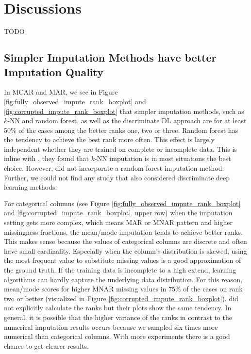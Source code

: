 

\section{Discussions}

TODO

\subsection{Simpler Imputation Methods have better Imputation Quality}
%
In MCAR and MAR, we see in Figure \ref{fig:fully_observed_impute_rank_boxplot} and \ref{fig:corrupted_impute_rank_boxplot} that simpler imputation methods, such as $k$-NN and random forest, as well as the discriminate DL approach are for at least $50\%$ of the cases among the better ranks one, two or three. Random forest has the tendency to achieve the best rank more often. This effect is largely independent whether they are trained on complete or incomplete data.
This is inline with \cite{Imputation_Benchmark_3, Imputation_Benchmark_2, Imputation_Benchmark_4}, they found that $k$-NN imputation is in most situations the best choice. However, \cite{Imputation_Benchmark_2, Imputation_Benchmark_4} did not incorporate a random forest imputation method. Further, we could not find any study that also considered discriminate deep learning methods.

For categorical columns (see Figure \ref{fig:fully_observed_impute_rank_boxplot} and \ref{fig:corrupted_impute_rank_boxplot}, upper row) when the imputation setting gets more complex, which means MAR or MNAR pattern and higher missingness fractions, the mean/mode imputation tends to achieve better ranks. This makes sense because the values of categorical columns are discrete and often have small cardinality. Especially when the column's distribution is skewed, using the most frequent value to substitute missing values is a good approximation of the ground truth. If the training data is incomplete to a high extend, learning algorithms can hardly capture the underlying data distribution. For this reason, mean/mode scores for higher MNAR missing values in $75\%$ of the cases on rank two or better (visualized in Figure \ref{fig:corrupted_impute_rank_boxplot}). \cite{Imputation_Benchmark_3} did not explicitly calculate the ranks but their plots show the same tendency. In general, it is possible that the higher variance of the ranks in contrast to the numerical imputation results occurs because we sampled six times more numerical than categorical columns. With more experiments there is a good chance to get clearer results.

